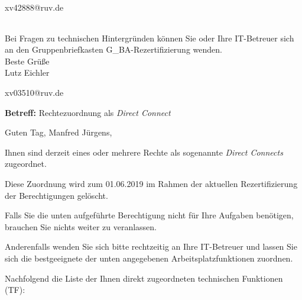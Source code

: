 \documentclass[a4paper,landscape,12pt]{letter}
\begin{document}
\begin{letter}{xv42888@ruv.de\hfill \break}
\begin{tiny}
\begin{longtable}{|p{35mm}|p{15mm}|p{25mm}|p{10mm}|p{40mm}|p{50mm}|p{50mm}|}
\hline
		\end{longtable}
		\end{tiny}
	
\begin{minipage}{\textwidth}
			Bei Fragen zu technischen Hintergründen können Sie 
			oder Ihre IT-Betreuer sich an den Gruppenbriefkasten 
			G\_BA-Rezertifizierung
			wenden.\\
			\linebreak
			Beste Grüße\\
			Lutz Eichler
	\end{minipage}
	\end{letter}
	
\begin{letter}{xv03510@ruv.de\hfill \break}
\begin{normalsize}
	\opening{\textbf{Betreff:} Rechtezuordnung als \emph{Direct Connect}}
	\begin{normalsize} \hfill
	\end{normalsize}

	\begin{normalsize}
		Guten Tag, 
	Manfred Jürgens, \hfill \break
	\end{normalsize}
	\end{normalsize}
	
\begin{normalsize}
	Ihnen sind derzeit eines oder mehrere Rechte als sogenannte \emph{Direct Connects} zugeordnet.
	
	Diese Zuordnung wird zum 01.06.2019 im Rahmen der aktuellen Rezertifizierung der Berechtigungen gelöscht.
	
	Falls Sie die unten aufgeführte Berechtigung nicht für Ihre Aufgaben benötigen, 
	brauchen Sie nichts weiter zu veranlassen.
	
	Anderenfalls wenden Sie sich bitte rechtzeitig an Ihre IT-Betreuer 
	und lassen Sie sich die bestgeeignete der unten angegebenen Arbeitsplatzfunktionen zuordnen.
	\end{normalsize}
	
\begin{normalsize}
	Nachfolgend die Liste der Ihnen direkt zugeordneten technischen Funktionen (TF):


\end{normalsize}
\end{letter}
\end{document}
